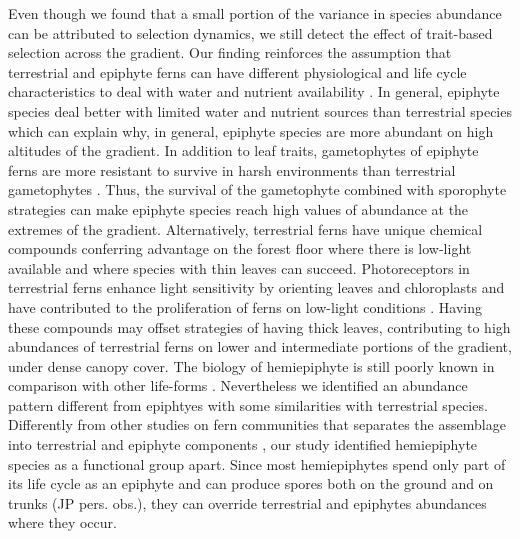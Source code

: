 \documentclass[12pt]{article}
\begin{document}
Even though we found that a small portion of the variance in species abundance can be attributed to selection dynamics, we still detect the effect of trait-based selection across the gradient.  
Our finding reinforces the assumption that terrestrial and epiphyte ferns can have different physiological and life cycle characteristics to deal with water and nutrient availability \citep{Page2002, Watkins2012}. In general, epiphyte species deal better with limited water and nutrient sources than terrestrial species \citep{Page2002, Schuettpelz2009, Watkins2012} which can explain why, in general, epiphyte species are more  abundant on high altitudes of the gradient. In addition to leaf traits, gametophytes of epiphyte ferns are more resistant to survive in harsh environments than terrestrial gametophytes \citep{Watkins2012}. Thus, the survival of the gametophyte combined with sporophyte strategies can make epiphyte species reach high values of abundance at the extremes of the gradient. Alternatively, terrestrial ferns have unique chemical compounds conferring advantage on the forest floor where there is low-light available \citep{Kawai2003} and where species with thin leaves can succeed. Photoreceptors in terrestrial ferns enhance light sensitivity by orienting leaves and chloroplasts and have contributed to the proliferation of ferns on low-light conditions \citep{Kawai2003}. Having these compounds may offset strategies of having thick leaves, contributing to high abundances of terrestrial ferns on lower and intermediate portions of the gradient, under dense canopy
cover. The biology of hemiepiphyte is still poorly known in comparison with other life-forms \citep{Watkins2012}. Nevertheless we identified an abundance pattern different from epiphtyes with some similarities with terrestrial species. Differently from other studies on fern communities that separates the assemblage into terrestrial and epiphyte components \citep{WatkinsJr2006, Kluge2010}, our study identified hemiepiphyte species as a functional group apart. Since most hemiepiphytes spend only part of its life cycle as an epiphyte and can produce spores both on the ground and on trunks (JP pers. obs.), they can override terrestrial and epiphytes abundances where they occur. 
\end{document}
